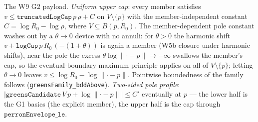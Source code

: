 \begin{lemma}
\label{lem:perron-greens-candidate-cap-profile}
The W9 G2 payload.  \emph{Uniform upper cap}: every member satisfies
\(v \le \texttt{truncatedLogCap}\,p\,\rho + C\) on \(V \setminus \{p\}\)
with the member-independent constant \(C = \log R_0 - \log\rho\), where
\(V \subseteq B(p, R_0)\).  The member-dependent pole constant washes
out by a \(\theta \to 0\) device with no annuli: for \(\theta > 0\) the
harmonic shift \(v + \texttt{logCup}\,p\,R_0\,(-(1+\theta))\) is again
a member (W5b closure under harmonic shifts), near the pole the excess
\(\theta\log\lVert\cdot - p\rVert \to -\infty\) swallows the member's
cap, so the eventual-boundary maximum principle applies on all of
\(V \setminus \{p\}\); letting \(\theta \to 0\) leaves
\(v \le \log R_0 - \log\lVert\cdot - p\rVert\).  Pointwise boundedness
of the family follows (\texttt{greensFamily\_bddAbove}).
\emph{Two-sided pole profile}:
\(|\texttt{greensCandidate}\,V\,p + \log\lVert\cdot - p\rVert| \le C'\)
eventually at \(p\) — the lower half is the G1 basics (the explicit
member), the upper half is the cap through
\(\texttt{perronEnvelope\_le}\).
\leanok
\end{lemma}

